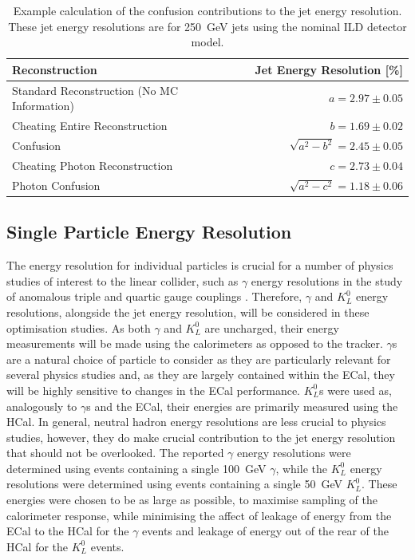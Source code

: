 \begin{table}[h!]
\centering
\begin{tabular}{ l r}
\hline
Reconstruction & Jet Energy Resolution [\%] \\
\hline
Standard Reconstruction (No MC Information) & $a = 2.97\pm0.05$ \\
Cheating Entire Reconstruction & $b = 1.69\pm0.02$ \\
Confusion & $\sqrt{a^{2}-b^{2}} = 2.45\pm0.05$ \\
\hline
Cheating Photon Reconstruction & $c = 2.73\pm0.04$ \\
Photon Confusion & $\sqrt{a^{2}-c^{2}} =1.18\pm0.06$ \\
\hline
\end{tabular}
\caption[Example calculation of the confusion contributions to the jet energy resolution.  These jet energy resolutions are for 250~GeV jets using the nominal ILD detector model.]{Example calculation of the confusion contributions to the jet energy resolution.  These jet energy resolutions are for 250~GeV jets using the nominal ILD detector model.}
\label{table:confusioncalculation}
\end{table}


\subsection{Single Particle Energy Resolution}
The energy resolution for individual particles is crucial for a number of physics studies of interest to the linear collider, such as $\gamma$ energy resolutions in the study of anomalous triple and quartic gauge couplings \cite{Chatrchyan:2013fya,ATLAS:2012mec,Chatrchyan:2014bza}.  Therefore, $\gamma$ and $K^{0}_{L}$ energy resolutions, alongside the jet energy resolution, will be considered in these optimisation studies.  As both $\gamma$ and $K^{0}_{L}$ are uncharged, their energy measurements will be made using the calorimeters as opposed to the tracker.  $\gamma$s are a natural choice of particle to consider as they are particularly relevant for several physics studies and, as they are largely contained within the ECal, they will be highly sensitive to changes in the ECal performance.  $K^{0}_{L}$s were used as, analogously to $\gamma$s and the ECal, their energies are primarily measured using the HCal.  In general, neutral hadron energy resolutions are less crucial to physics studies, however, they do make crucial contribution to the jet energy resolution that should not be overlooked.  The reported $\gamma$ energy resolutions were determined using events containing a single 100~GeV $\gamma$, while the $K^{0}_{L}$ energy resolutions were determined using events containing a single 50~GeV $K^{0}_{L}$.  These energies were chosen to be as large as possible, to maximise sampling of the calorimeter response, while minimising the affect of leakage of energy from the ECal to the HCal for the $\gamma$ events and leakage of energy out of the rear of the HCal for the $K^{0}_{L}$ events.

